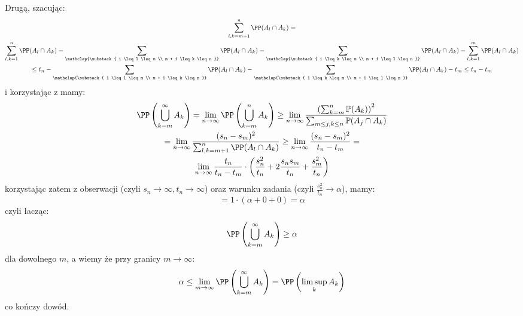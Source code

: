 \documentclass[11pt]{scrartcl}
\begin{document}
    Drugą, szacując:
    \begin{gather*}
        \sum_{l,k=m+1}^{n} \PP (A_l \cap A_k) = \\
        \sum_{l,k = 1}^{n} \PP (A_l \cap A_k) -   
        \sum_{\mathclap{\substack{
                1 \leq l \leq m \\
                m + 1 \leq k \leq n
        }}} \PP (A_l \cap A_k) -
        \sum_{\mathclap{\substack{
                1 \leq k \leq m \\
                m + 1 \leq l \leq n
        }}} \PP (A_l \cap A_k) -
        \sum_{l,k=1}^{m} \PP (A_l \cap A_k)  \\
        \leq t_n - \sum_{\mathclap{\substack{
                1 \leq l \leq m \\
                m + 1 \leq k \leq n
        }}} \PP (A_l \cap A_k) -
        \sum_{\mathclap{\substack{
                1 \leq k \leq m \\
                m + 1 \leq l \leq n
        }}} \PP (A_l \cap A_k) - t_m
        \leq t_n - t_m
    \end{gather*}
    i korzystając z  mamy:
    \begin{gather*}
        \PP \left ( \bigcup_{k = m}^{\infty} A_k \right ) = 
        \lim_{n \to \infty} \PP \left ( \bigcup_{k = m}^{n} A_k \right ) \geq
        \lim_{n \to \infty} \frac{\left( \sum_{k=m}^{n} \mathbb{P}(A_k) \right)^2}
            {\sum_{m \leq j, k \leq n} \mathbb{P}(A_j \cap A_k)} \\
        = \lim_{n \to \infty} \frac{(s_n - s_m)^2}
            {\sum_{l,k=m+1}^{n} \PP (A_l \cap A_k)}
        \geq \lim_{n \to \infty} \frac{(s_n - s_m)^2}{t_n - t_m} = \\
        \lim_{n \to \infty } \frac{t_n}{t_n - t_m} \cdot 
            \left ( \frac{s_n^2}{t_n} + 2 \frac{s_n s_m}{t_n} + \frac{s_m^2}{t_n} \right )
    \end{gather*}
    korzystając zatem z obserwacji (czyli $s_n \to \infty, t_n \to \infty$) 
    oraz warunku zadania (czyli $\frac{s_n^2}{t_n} \to \alpha $), mamy:
    \[
        = 1 \cdot ( \alpha + 0 + 0 ) = \alpha 
    \]
    czyli łacząc:
    \[
        \PP \left ( \bigcup_{k = m}^{\infty} A_k \right ) \geq \alpha 
    \]
    dla dowolnego $m$, a wiemy że przy granicy $m \to \infty $: 
    \[
        \alpha \leq \lim_{m \to \infty} \PP \left ( \bigcup_{k = m}^{\infty} A_k \right ) = 
        \PP \left ( \limsup_k A_k \right )
    \]
    co kończy dowód.
\end{document}
